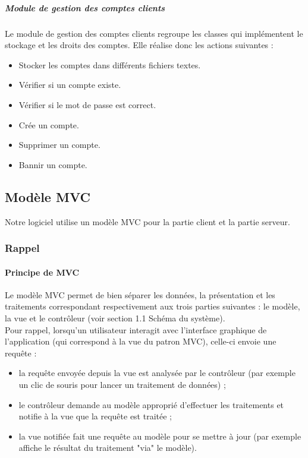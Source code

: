 \documentclass[10pt,a4paper]{report}
\begin{document}
				\subparagraph{Module de gestion des comptes clients}
				\begin{flushleft}
					Le module de gestion des comptes clients regroupe les classes qui implémentent le stockage et les droits des comptes. Elle réalise donc les actions suivantes : 
					\begin{itemize}
						\item Stocker les comptes dans différents fichiers textes.
						\item Vérifier si un compte existe.
						\item Vérifier si le mot de passe est correct.
						\item Crée un compte.
						\item Supprimer un compte.
						\item Bannir un compte.
					\end{itemize}
				\end{flushleft}
				
				
	\subsection{Modèle MVC}
		Notre logiciel utilise un modèle MVC pour la partie client et la partie serveur.
		\subsubsection{Rappel}
			
			\paragraph{Principe de MVC}
			\begin{flushleft}

			Le modèle MVC permet de bien séparer les données, la présentation et les traitements correspondant respectivement aux trois parties suivantes : le modèle, la vue et le contrôleur (voir section 1.1 Schéma du système).\\
Pour rappel, lorsqu'un utilisateur interagit avec l'interface graphique de l'application (qui correspond à la vue du patron MVC), celle-ci envoie une requête  :
				\begin{itemize}
					\item la requête envoyée depuis la vue est analysée par le contrôleur (par exemple un clic de souris pour lancer un traitement de données) ;
    				\item le contrôleur demande au modèle approprié d'effectuer les traitements et notifie à la vue que la requête est traitée ;
    				\item la vue notifiée fait une requête au modèle pour se mettre à jour (par exemple affiche le résultat du traitement "via" le modèle).

				\end{itemize}
			\end{flushleft}
			
\end{document}
